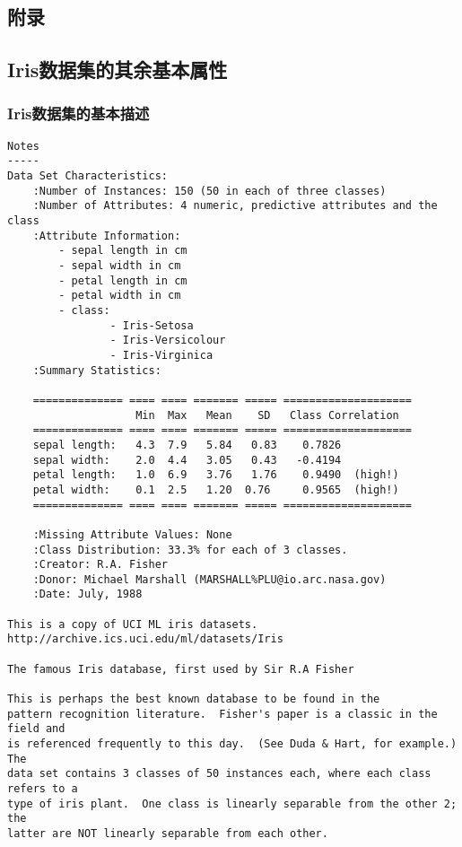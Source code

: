 \documentclass[12pt,a4paper]{article}
\theoremstyle{definition}
\begin{document}
\begin{appendix}
	\section{附录}
	\subsection{Iris数据集的其余基本属性}
	
	\subsubsection{Iris数据集的基本描述}
		\begin{lstlisting}[frame=shadowbox, breaklines=True, title=Iris数据集基本描述]
Notes
-----
Data Set Characteristics:
    :Number of Instances: 150 (50 in each of three classes)
    :Number of Attributes: 4 numeric, predictive attributes and the class
    :Attribute Information:
        - sepal length in cm
        - sepal width in cm
        - petal length in cm
        - petal width in cm
        - class:
                - Iris-Setosa
                - Iris-Versicolour
                - Iris-Virginica
    :Summary Statistics:

    ============== ==== ==== ======= ===== ====================
                    Min  Max   Mean    SD   Class Correlation
    ============== ==== ==== ======= ===== ====================
    sepal length:   4.3  7.9   5.84   0.83    0.7826
    sepal width:    2.0  4.4   3.05   0.43   -0.4194
    petal length:   1.0  6.9   3.76   1.76    0.9490  (high!)
    petal width:    0.1  2.5   1.20  0.76     0.9565  (high!)
    ============== ==== ==== ======= ===== ====================

    :Missing Attribute Values: None
    :Class Distribution: 33.3% for each of 3 classes.
    :Creator: R.A. Fisher
    :Donor: Michael Marshall (MARSHALL%PLU@io.arc.nasa.gov)
    :Date: July, 1988

This is a copy of UCI ML iris datasets.
http://archive.ics.uci.edu/ml/datasets/Iris

The famous Iris database, first used by Sir R.A Fisher

This is perhaps the best known database to be found in the
pattern recognition literature.  Fisher's paper is a classic in the field and
is referenced frequently to this day.  (See Duda & Hart, for example.)  The
data set contains 3 classes of 50 instances each, where each class refers to a
type of iris plant.  One class is linearly separable from the other 2; the
latter are NOT linearly separable from each other.


\end{lstlisting}
\end{appendix}
\end{document}
